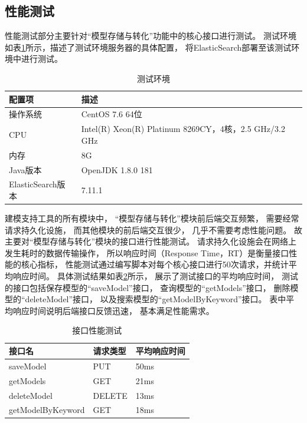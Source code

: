 \subsection{性能测试}

性能测试部分主要针对“模型存储与转化”功能中的核心接口进行测试。
测试环境如表\ref{testcase5}所示，描述了测试环境服务器的具体配置，
将ElasticSearch部署至该测试环境中进行测试。

{\footnotesize
\begin{longtable}[h]{m{100pt}|m{285pt}}
    \caption[测试环境]{测试环境} \label{testcase5} \\
        \hline  
        配置项&描述\\
        \hline
        操作系统&CentOS 7.6 64位\\
        \hline
        CPU&Intel(R) Xeon(R) Platinum 8269CY，4核，2.5 GHz/3.2 GHz\\
        \hline
        内存&8G\\
        \hline
        Java版本& OpenJDK 1.8.0 181\\
        \hline
        ElasticSearch版本& 7.11.1\\
        \hline
\end{longtable} 
}

建模支持工具的所有模块中，
“模型存储与转化”模块前后端交互频繁，
需要经常请求持久化设施，
而其他模块的前后端交互很少，
几乎不需要考虑性能问题。
故主要对“模型存储与转化”模块的接口进行性能测试。
请求持久化设施会在网络上发生耗时的数据传输操作，
所以响应时间（Response Time，RT）是衡量接口性能的核心指标，
性能测试通过编写脚本对每个核心接口进行50次请求，并统计平均响应时间。
具体测试结果如表\ref{testcase6}所示，
展示了测试接口的平均响应时间，
测试的接口包括保存模型的“saveModel”接口，
查询模型的“getModels”接口，
删除模型的“deleteModel”接口，
以及搜索模型的“getModelByKeyword”接口。
表中平均响应时间说明后端接口反馈迅速，
基本满足性能需求。


{\footnotesize
\begin{longtable}[]{m{130pt}|m{100pt}|m{140pt}}
    \caption[接口性能测试]{接口性能测试} \label{testcase6} \\
        \hline  
        接口名&请求类型&平均响应时间\\
        \hline
        saveModel&PUT&50ms\\
        \hline
        getModels&GET&21ms\\
        \hline
        deleteModel&DELETE&13ms\\
        \hline
        getModelByKeyword&GET&18ms\\
        \hline
\end{longtable} 
}


